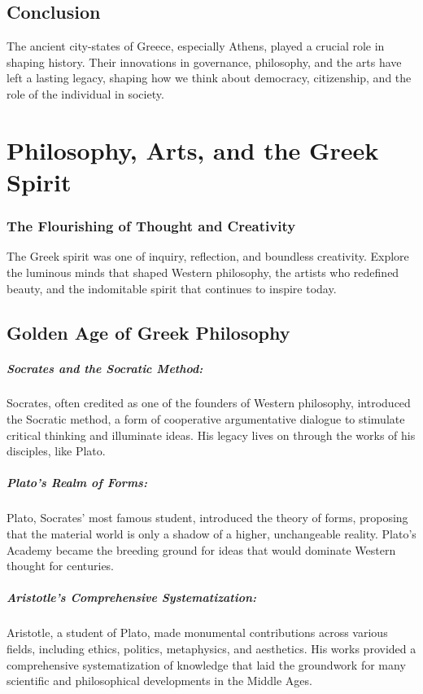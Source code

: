 \documentclass{book}
\begin{document}
\section*{Conclusion}

The ancient city-states of Greece, especially Athens, played a crucial role in shaping history. Their innovations in governance, philosophy, and the arts have left a lasting legacy, shaping how we think about democracy, citizenship, and the role of the individual in society.

\chapter{Philosophy, Arts, and the Greek Spirit}
\subsection*{The Flourishing of Thought and Creativity}
The Greek spirit was one of inquiry, reflection, and boundless creativity. Explore the luminous minds that shaped Western philosophy, the artists who redefined beauty, and the indomitable spirit that continues to inspire today.

\section*{Golden Age of Greek Philosophy}

\paragraph{Socrates and the Socratic Method:}
Socrates, often credited as one of the founders of Western philosophy, introduced the Socratic method, a form of cooperative argumentative dialogue to stimulate critical thinking and illuminate ideas. His legacy lives on through the works of his disciples, like Plato.

\paragraph{Plato’s Realm of Forms:}
Plato, Socrates’ most famous student, introduced the theory of forms, proposing that the material world is only a shadow of a higher, unchangeable reality. Plato’s Academy became the breeding ground for ideas that would dominate Western thought for centuries.

\paragraph{Aristotle’s Comprehensive Systematization:}
Aristotle, a student of Plato, made monumental contributions across various fields, including ethics, politics, metaphysics, and aesthetics. His works provided a comprehensive systematization of knowledge that laid the groundwork for many scientific and philosophical developments in the Middle Ages.
\end{document}
